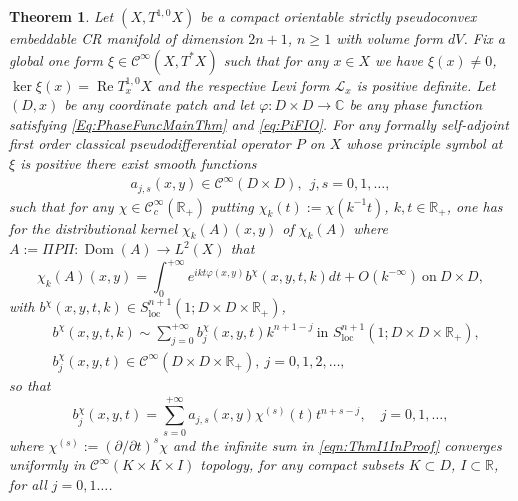 \documentclass[12pt]{amsart}
\newtheorem{theorem}{Theorem}[section]
\theoremstyle{definition}
\theoremstyle{named}
\numberwithin{equation}{subsection}
\newcommand{\R}{\mathbb{R}}
\newcommand{\C}{\mathbb{C}}
\def\cC{\mathscr{C}}
\begin{document}
\begin{theorem}\label{t-gue241123yyd}
	Let $(X,T^{1,0}X)$ be a compact orientable strictly pseudoconvex embeddable CR manifold of dimension $2n+1$, \(n\geq 1\) with volume form \(dV\). Fix a global one form $\xi\in\cC^\infty(X,T^*X)$ such that for any \(x\in X\) we have $\xi(x)\neq0$,  $\ker\xi(x)=\operatorname{Re}T_x^{1,0}X$ and the respective Levi form $\mathcal{L}_x$ is positive definite. Let $(D,x)$ be any coordinate patch and let 
	$\varphi:D\times D\to\C$ be any phase function satisfying \eqref{Eq:PhaseFuncMainThm} and \eqref{eq:PiFIO}. For any formally self-adjoint first order classical pseudodifferential operator \(P\) on \(X\) whose principle symbol  at \(\xi\) is positive there exist smooth functions
	\begin{eqnarray*}
		a_{j,s}(x,y)\in\cC^\infty(D\times D),\ \ j,s=0,1,\ldots,
	\end{eqnarray*}
	such that for any \(\chi\in \mathscr{C}^\infty_c(\R_+)\) putting \(\chi_k(t):=\chi(k^{-1}t)\), \(k,t\in\R_+\), one has for the distributional kernel $\chi_k(A)(x,y)$ of $\chi_k(A)$ where \(A:=\Pi P \Pi\colon \operatorname{Dom}(A)\to L^2(X)  \) that
	\begin{equation*}
		\chi_k(A)(x,y)=\int_0^{+\infty} 
		e^{ikt\varphi(x,y)}b^\chi(x,y,t,k)dt+O\left(k^{-\infty}\right)~\text{on}~D\times D,
	\end{equation*}
	 with $b^\chi(x,y,t,k)\in S^{n+1}_{\mathrm{loc}}
	 (1;D\times D\times{\R}_+)$,
	 \begin{equation*}
	 	\begin{split}
	 		&b^\chi(x,y,t,k)\sim\sum_{j=0}^{+\infty}b^\chi_{j}(x,y,t)k^{n+1-j}~
	 		\text{in $S^{n+1}_{\mathrm{loc}}(1;D\times D\times{\R}_+)$},\\
	 		&b^\chi_j(x,y,t)\in\mathscr{C}^\infty(D\times D\times{\R}_+),~j=0,1,2,\ldots,
	 	\end{split}
	 \end{equation*}
	 so that 
	 \begin{equation}\label{eqn:ThmI1InProof}
	 	b^\chi_j(x,y,t)=\sum^{+\infty}_{s=0}a_{j,s}(x,y)\chi^{(s)}(t)t^{n+s-j},\quad j=0,1,\ldots,
	 \end{equation}
	 where \(\chi^{(s)}:=(\partial/\partial t)^s\chi\) and the infinite sum in \eqref{eqn:ThmI1InProof} converges uniformly in $\cC^{\infty}(K\times K\times I)$ topology, for any compact subsets $K\subset D$, $I\subset\mathbb R$, for all $j=0,1\dots$.  
\end{theorem} 
\end{document}
